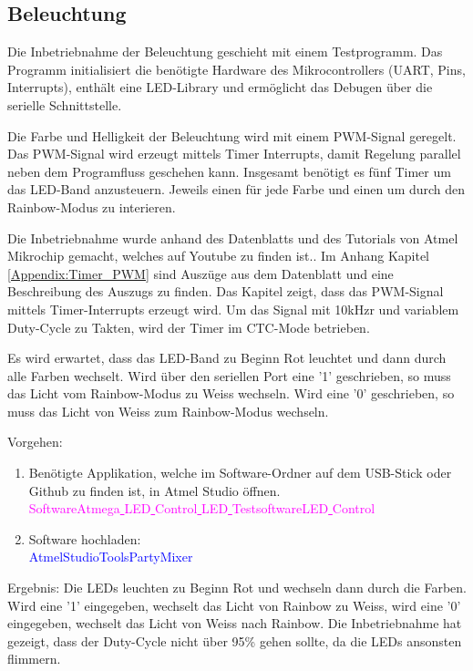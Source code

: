 \subsection{Beleuchtung}
\label{subsec:Inbetriebnahme_Beleuchtung}

Die Inbetriebnahme der Beleuchtung geschieht mit einem Testprogramm. Das Programm initialisiert die benötigte Hardware des Mikrocontrollers (UART, Pins, Interrupts), enthält eine LED-Library und ermöglicht das Debugen über die serielle Schnittstelle.

Die Farbe und Helligkeit der Beleuchtung wird mit einem PWM-Signal geregelt. Das PWM-Signal wird erzeugt mittels Timer Interrupts, damit Regelung parallel neben dem Programfluss geschehen kann. Insgesamt benötigt es fünf Timer um das LED-Band anzusteuern. Jeweils einen für jede Farbe und einen um durch den Rainbow-Modus zu interieren.

Die Inbetriebnahme wurde anhand des Datenblatts und des Tutorials von Atmel Mikrochip gemacht, welches auf Youtube zu finden ist.\cite{mikrochip_makes_getting_2015}\cite{mikrochip_makes_getting_2015-1}\cite{mikrochip_makes_getting_2015-2}. Im Anhang Kapitel \ref{Appendix:Timer_PWM} sind Auszüge aus dem Datenblatt und eine Beschreibung des Auszugs zu finden. Das Kapitel zeigt, dass das PWM-Signal mittels Timer-Interrupts erzeugt wird. Um das Signal mit 10kHzr und variablem Duty-Cycle zu Takten, wird der Timer im CTC-Mode betrieben.

Es wird erwartet, dass das LED-Band zu Beginn Rot leuchtet und dann durch alle Farben wechselt. Wird über den seriellen Port eine '1' geschrieben, so muss das Licht vom Rainbow-Modus zu Weiss wechseln. Wird eine '0' geschrieben, so muss das Licht von Weiss zum Rainbow-Modus wechseln.

Vorgehen:

\begin{enumerate}
\item Benötigte Applikation, welche im Software-Ordner auf dem USB-Stick oder Github \cite{aebi_projekt-6softwareatmega_2020} zu finden ist, in Atmel Studio öffnen.\\
\textcolor{magenta}{Software\textrightarrow Atmega\underline{ }LED\underline{ }Control\underline{ }LED\underline{ }Testsoftware\textrightarrow LED\underline{ }Control}\\

\item Software hochladen:\\
\textcolor{blue}{AtmelStudio\textrightarrow Tools\textrightarrow PartyMixer}\\

\end{enumerate}

Ergebnis: Die LEDs leuchten zu Beginn Rot und wechseln dann durch die Farben. Wird eine '1' eingegeben, wechselt das Licht von Rainbow zu Weiss, wird eine '0' eingegeben, wechselt das Licht von Weiss nach Rainbow.
Die Inbetriebnahme hat gezeigt, dass der Duty-Cycle nicht über 95\% gehen sollte, da die LEDs ansonsten flimmern.